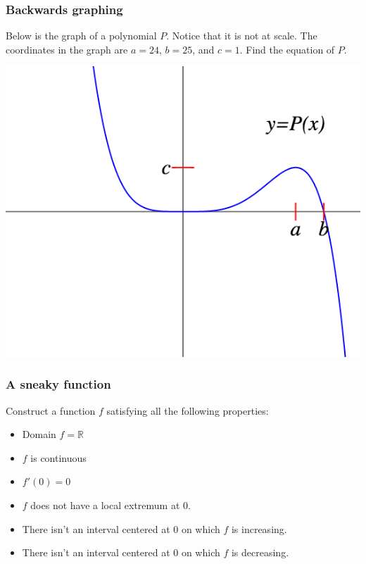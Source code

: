 \documentclass[14pt]{beamer}
\begin{document}
	\begin{frame}[t]
		\frametitle{Backwards graphing}

		Below is the graph of a polynomial $P$. Notice that it is not at scale. The
		coordinates in the graph are $a=24$, $b=25$, and $c=1$. Find the equation of
		$P$.

		\begin{center}
			\includegraphics[scale=.38]{G18}
		\end{center}
	\end{frame}

	\begin{frame}[t]
		\frametitle{A sneaky function}

		Construct a function $f$ satisfying all the following properties:

		\medskip
		\begin{itemize}
			\item Domain $\displaystyle f = \mathbb{R}$

			\item $f$ is continuous

			\item $f'(0)=0$

			\item $f$ does not have a local extremum at $0$.

			\item There isn't an interval centered at $0$ on which $f$ is increasing.

			\item There isn't an interval centered at $0$ on which $f$ is decreasing.
		\end{itemize}
	\end{frame}

\end{document}
